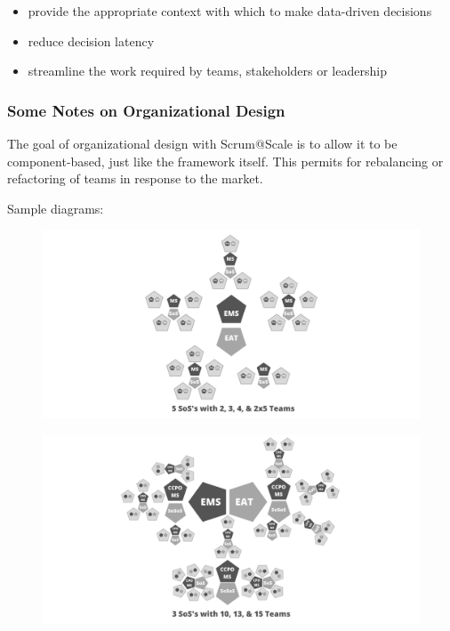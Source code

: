 \documentclass[12pt,a4paper,parskip=full]{scrartcl}
\begin{document}
\begin{itemize}
\itemsep1pt\parskip0pt
\item
  provide the appropriate context with which to make data-driven
  decisions
\item
  reduce decision latency
\item
  streamline the work required by teams, stakeholders or leadership
\end{itemize}

\subsubsection{Some Notes on Organizational
Design}\label{some-notes-on-organizational-design}

The goal of organizational design with Scrum@Scale is to allow it to be
component-based, just like the framework itself. This permits for
rebalancing or refactoring of teams in response to the market.

Sample diagrams:
\begin{figure}
    \centering
    \includegraphics[scale=0.15]{4.png}
\end{figure}


\begin{figure}
    \centering
    \includegraphics[scale=0.15]{5.png}
\end{figure}
\end{document}
